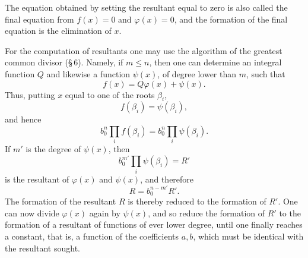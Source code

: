 \documentclass[11pt]{article}
\begin{document}
The equation obtained by setting the resultant equal to zero is also called the final equation from $f(x)=0$ and $\varphi(x)=0$, and the formation of the final equation is the elimination of $x$.

For the computation of resultants one may use the algorithm of the greatest common divisor (\S\,6). Namely, if $m\le n$, then one can determine an integral function $Q$ and likewise a function $\psi(x)$, of degree lower than $m$, such that
\[
f(x)=Q\varphi(x)+\psi(x).
\]
Thus, putting $x$ equal to one of the roots $\beta_i$,
\[
f(\beta_i)=\psi(\beta_i),
\]
and hence
\begin{equation}
b_0^n\prod_i f(\beta_i)=b_0^n\prod_i\psi(\beta_i).
\tag{8}
\end{equation}
If $m'$ is the degree of $\psi(x)$, then
\begin{equation}
b_0^{m'}\prod_i\psi(\beta_i)=R'
\tag{9}
\end{equation}
is the resultant of $\varphi(x)$ and $\psi(x)$, and therefore
\begin{equation}
R=b_0^{n-m'}R'.
\tag{10}
\end{equation}
The formation of the resultant $R$ is thereby reduced to the formation of $R'$. One can now divide $\varphi(x)$ again by $\psi(x)$, and so reduce the formation of $R'$ to the formation of a resultant of functions of ever lower degree, until one finally reaches a constant, that is, a function of the coefficients $a,b$, which must be identical with the resultant sought.
\end{document}
